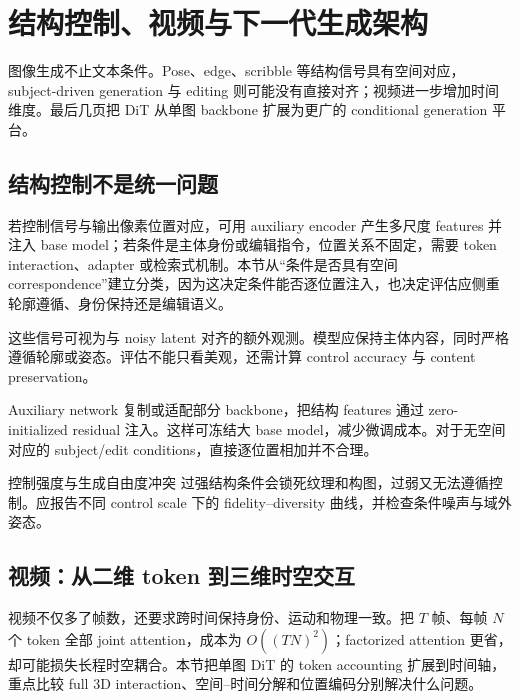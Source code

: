 \section{结构控制、视频与下一代生成架构}

图像生成不止文本条件。Pose、edge、scribble 等结构信号具有空间对应，subject-driven generation 与 editing 则可能没有直接对齐；视频进一步增加时间维度。最后几页把 DiT 从单图 backbone 扩展为更广的 conditional generation 平台。

\subsection{结构控制不是统一问题}

若控制信号与输出像素位置对应，可用 auxiliary encoder 产生多尺度 features 并注入 base model；若条件是主体身份或编辑指令，位置关系不固定，需要 token interaction、adapter 或检索式机制。本节从“条件是否具有空间 correspondence”建立分类，因为这决定条件能否逐位置注入，也决定评估应侧重轮廓遵循、身份保持还是编辑语义。


这些信号可视为与 noisy latent 对齐的额外观测。模型应保持主体内容，同时严格遵循轮廓或姿态。评估不能只看美观，还需计算 control accuracy 与 content preservation。


Auxiliary network 复制或适配部分 backbone，把结构 features 通过 zero-initialized residual 注入。这样可冻结大 base model，减少微调成本。对于无空间对应的 subject/edit conditions，直接逐位置相加并不合理。


\begin{warningbox}{控制强度与生成自由度冲突}
过强结构条件会锁死纹理和构图，过弱又无法遵循控制。应报告不同 control scale 下的 fidelity--diversity 曲线，并检查条件噪声与域外姿态。
\end{warningbox}

\subsection{视频：从二维 token 到三维时空交互}

视频不仅多了帧数，还要求跨时间保持身份、运动和物理一致。把 $T$ 帧、每帧 $N$ 个 token 全部 joint attention，成本为 $O((TN)^2)$；factorized attention 更省，却可能损失长程时空耦合。本节把单图 DiT 的 token accounting 扩展到时间轴，重点比较 full 3D interaction、空间--时间分解和位置编码分别解决什么问题。

